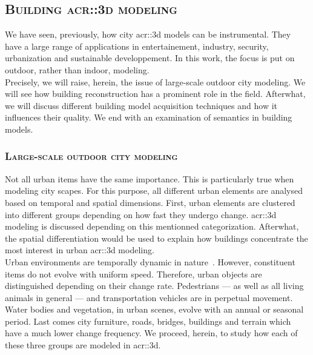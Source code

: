     \subsection{\textsc{Building \texorpdfstring{\gls*{acr::3d}}{3D} modeling}}
        \label{subsec::introduction::urban_3d_reconstruction::building_3d_modeling}
        We have seen, previously, how city \gls{acr::3d} models can be instrumental.
        They have a large range of applications in entertainement, industry, security, urbanization and sustainable developpement.
        In this work, the focus is put on outdoor, rather than indoor, modeling.\\
        Precisely, we will raise, herein, the issue of large-scale outdoor city modeling.
        We will see how building reconstruction has a prominent role in the field.
        Afterwhat, we will discuss different building model acquisition techniques and how it influences their quality.
        We end with an examination of semantics in building models.

        \subsubsection{\textsc{Large-scale outdoor city modeling}}
            Not all urban items have the same importance.
            This is particularly true when modeling city scapes.
            For this purpose, all different urban elements are analysed based on temporal and spatial dimensions.
            First, urban elements are clustered into different groups depending on how fast they undergo change.
            \gls{acr::3d} modeling is discussed depending on this mentionned categorization.
            Afterwhat, the spatial differentiation would be used to explain how buildings concentrate the most interest in urban \gls{acr::3d} modeling.\\

            Urban environments are temporally dynamic in nature~\parencite{vanhoey2017varcity}.
            However, constituent items do not evolve with uniform speed.
            Therefore, urban objects are distinguished depending on their change rate.
            Pedestrians --- as well as all living animals in general --- and transportation vehicles are in perpetual movement.
            Water bodies and vegetation, in urban scenes, evolve with an annual or seasonal period.
            Last comes city furniture, roads, bridges, buildings and terrain which have a much lower change frequency.
            We proceed, herein, to study how each of these three groups are modeled in \gls{acr::3d}.\\

